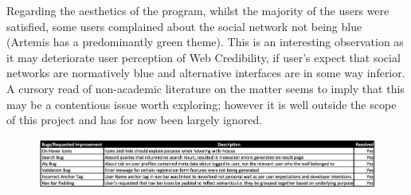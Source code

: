     Regarding the aesthetics of the program, whilst the majority of the users were satisfied, some users complained about the social network not being blue (Artemis has a predominantly green theme). This is an interesting observation as it may deteriorate user perception of Web Credibility, if user's expect that social networks are normatively blue and alternative interfaces are in some way inferior. A cursory read of non-academic literature on the matter seems to imply that this may be a contentious issue worth exploring; however it is well outside the scope of this project and has for now been largely ignored.
    
    
    
    
    
    
    
    
    
    
    
    \begin{figure}[h]
    	\includegraphics[scale=0.55]{chapters/chapter04/figures/issuesResolved.png}
    	\label{listOBugs}
    \end{figure}